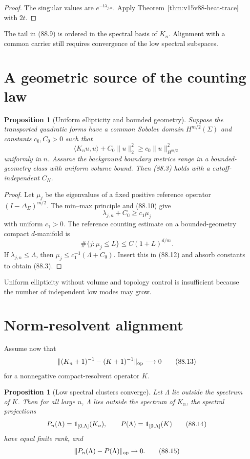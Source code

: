 \documentclass[11pt]{article}
\newtheorem{proposition}[theorem]{Proposition}
\theoremstyle{remark}
\begin{document}
\begin{proof}
The singular values are \(e^{-t\lambda_{j,n}}\).  Apply
Theorem~\ref{thm:v15v88-heat-trace} with \(2t\).
\end{proof}

The tail in (88.9) is ordered in the spectral basis of \(K_n\).
Alignment with a common carrier still requires convergence of the
low spectral subspaces.

\section{A geometric source of the counting law}

\begin{proposition}[Uniform ellipticity and bounded geometry]
\label{prop:v15v88-geometry}
Suppose the transported quadratic forms have a common Sobolev
domain \(H^{m/2}(\Sigma)\) and constants \(c_0,C_0>0\) such that
\[
 \langle K_nu,u\rangle+C_0\|u\|_2^2
 \geq c_0\|u\|_{H^{m/2}}^2                            \tag{88.10}
\]
uniformly in \(n\).  Assume the background boundary metrics range
in a bounded-geometry class with uniform volume bound.  Then
(88.3) holds with a cutoff-independent \(C_N\).
\end{proposition}

\begin{proof}
Let \(\mu_j\) be the eigenvalues of a fixed positive reference
operator \((I-\Delta_\Sigma)^{m/2}\).  The min--max principle and
(88.10) give
\[
 \lambda_{j,n}+C_0\geq c_1\mu_j                       \tag{88.11}
\]
with uniform \(c_1>0\).  The reference counting estimate on a
bounded-geometry compact \(d\)-manifold is
\[
 \#\{j:\mu_j\leq L\}\leq C(1+L)^{d/m}.                \tag{88.12}
\]
If \(\lambda_{j,n}\leq\Lambda\), then
\(\mu_j\leq c_1^{-1}(\Lambda+C_0)\).  Insert this in (88.12) and
absorb constants to obtain (88.3).
\end{proof}

Uniform ellipticity without volume and topology control is
insufficient because the number of independent low modes may grow.

\section{Norm-resolvent alignment}

Assume now that
\[
 \|(K_n+1)^{-1}-(K+1)^{-1}\|_{\rm op}\longrightarrow0 \tag{88.13}
\]
for a nonnegative compact-resolvent operator \(K\).

\begin{proposition}[Low spectral clusters converge]
\label{prop:v15v88-clusters}
Let \(\Lambda\) lie outside the spectrum of \(K\).  Then for all
large \(n\), \(\Lambda\) lies outside the spectrum of \(K_n\), the
spectral projections
\[
 P_n(\Lambda)={\bf1}_{[0,\Lambda]}(K_n),\qquad
 P(\Lambda)={\bf1}_{[0,\Lambda]}(K)                   \tag{88.14}
\]
have equal finite rank, and
\[
 \|P_n(\Lambda)-P(\Lambda)\|_{\rm op}\to0.             \tag{88.15}
\]
\end{proposition}
\end{document}
